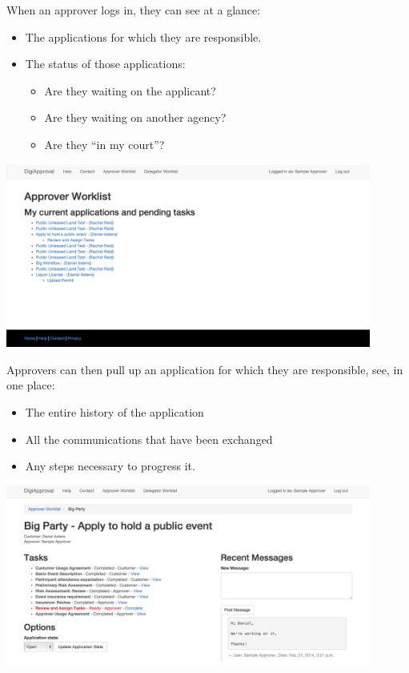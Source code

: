 \documentclass[12pt,a4paper,twosided]{article}
\begin{document}
When an approver logs in, they can see at a glance:

\begin{itemize}

\item
  The applications for which they are responsible.
\item
  The status of those applications:

  \begin{itemize}
  
  \item
    Are they waiting on the applicant?
  \item
    Are they waiting on another agency?
  \item
    Are they ``in my court''?
  \end{itemize}
\end{itemize}

\includegraphics[width=0.9\textwidth]{approver-portal.png}

Approvers can then pull up an application for which they are
responsible, see, in one place:

\begin{itemize}

\item
  The entire history of the application
\item
  All the communications that have been exchanged
\item
  Any steps necessary to progress it.
\end{itemize}

\includegraphics[width=0.9\textwidth]{internal-view.png}
\end{document}
